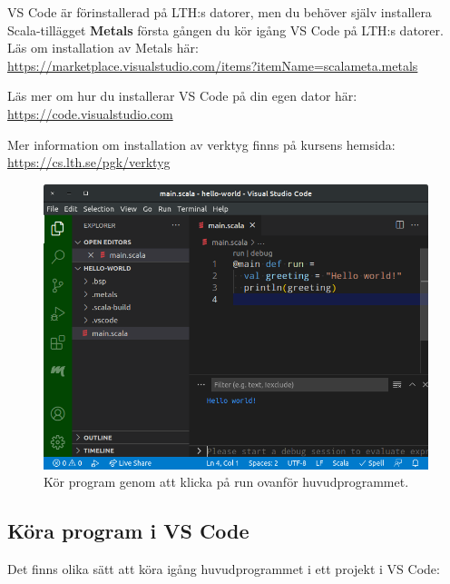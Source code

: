 VS Code är förinstallerad på LTH:s datorer, men du behöver själv installera Scala-tillägget \textbf{Metals} första gången du kör igång VS Code på LTH:s datorer. Läs om installation av Metals här: \\
\url{https://marketplace.visualstudio.com/items?itemName=scalameta.metals} 

Läs mer om hur du installerar VS Code på din egen dator här: \\\url{https://code.visualstudio.com}

Mer information om installation av verktyg finns på kursens hemsida: \\
\url{https://cs.lth.se/pgk/verktyg}

\begin{figure}
\centering
\includegraphics[width=1.0\textwidth]{../img/vscode-run}
\caption{Kör program genom att klicka på \textsf{run} ovanför huvudprogrammet. \label{appendix-ide:vscode-run}}
\end{figure}

\subsection{Köra program i VS Code}

Det finns olika sätt att köra igång huvudprogrammet i ett projekt i VS Code:

